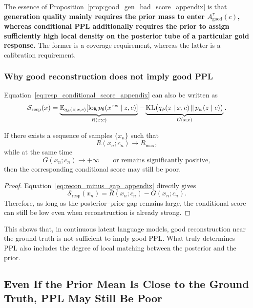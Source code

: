The essence of Proposition~\ref{prop:good_gen_bad_score_appendix} is that \textbf{generation quality mainly requires the prior mass to enter $A_{\mathrm{good}}^{\tau}(c)$, whereas conditional PPL additionally requires the prior to assign sufficiently high local density on the posterior tube of a particular gold response.} The former is a coverage requirement, whereas the latter is a calibration requirement.

\subsubsection{Why good reconstruction does not imply good PPL}

Equation~\eqref{eq:resp_conditional_score_appendix} can also be written as
\begin{equation}
\mathcal S_{\mathrm{resp}}(x)
=
\underbrace{
\mathbb{E}_{q_{\phi}(z\mid x,c)}[\log p_{\theta}(x^{\mathrm{res}}\mid z,c)]
}_{R(x;c)}
-
\underbrace{
\mathrm{KL}\bigl(q_{\phi}(z\mid x,c)\,\|\,p_{\psi}(z\mid c)\bigr)
}_{G(x;c)}.
\label{eq:recon_minus_gap_appendix}
\end{equation}

\begin{proposition}
\label{prop:reconstruction_not_enough_appendix}
If there exists a sequence of samples $\{x_n\}$ such that
\[
R(x_n;c_n)\to R_{\max},
\]
while at the same time
\[
G(x_n;c_n)\to +\infty
\qquad\text{or remains significantly positive},
\]
then the corresponding conditional score may still be poor.
\end{proposition}

\begin{proof}
Equation~\eqref{eq:recon_minus_gap_appendix} directly gives
\[
\mathcal S_{\mathrm{resp}}(x_n)=R(x_n;c_n)-G(x_n;c_n).
\]
Therefore, as long as the posterior--prior gap remains large, the conditional score can still be low even when reconstruction is already strong.
\end{proof}

This shows that, in continuous latent language models, good reconstruction near the ground truth is not sufficient to imply good PPL. What truly determines PPL also includes the degree of local matching between the posterior and the prior.

\subsection{Even If the Prior Mean Is Close to the Ground Truth, PPL May Still Be Poor}

